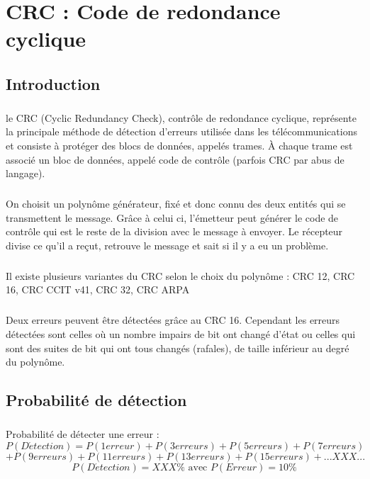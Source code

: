 
\chapter{CRC : Code de redondance cyclique}

    \section{Introduction}

        \paragraph{}
le CRC (Cyclic Redundancy Check), contrôle de redondance cyclique,
représente la principale méthode de détection d'erreurs utilisée dans les télécommunications et
consiste à protéger des blocs de données, appelés trames.
À chaque trame est associé un bloc de données, appelé code de contrôle (parfois CRC par abus de langage).
        \paragraph{}
On choisit un polynôme générateur, fixé et donc connu des deux entités qui se transmettent le message.
Grâce à celui ci, l'émetteur peut générer le code de contrôle qui est le reste de la division avec le message à envoyer.
Le récepteur divise ce qu'il a reçut, retrouve le message et sait si il y a eu un problème.
        \paragraph{}
Il existe plusieurs variantes du CRC selon le choix du polynôme : CRC 12, CRC 16, CRC CCIT v41, CRC 32, CRC ARPA
        \paragraph{}
Deux erreurs peuvent être détectées grâce au CRC 16.
Cependant les erreurs détectées sont celles où un nombre impairs de bit ont changé d'état ou
celles qui sont des suites de bit qui ont tous changés (rafales), de taille inférieur au
degré du polynôme.


    \section{Probabilité de détection}

        \paragraph{}
Probabilité de détecter une erreur :
\[  P(D\acute{e}tection) = P(1 erreur) + P(3 erreurs) + P(5 erreurs) + P(7 erreurs) \]
\[  + P(9 erreurs) + P(11 erreurs) + P(13 erreurs) + P(15 erreurs) + ...XXX... \]
\[  P(D\acute{e}tection) =  XXX\% \text{ avec } P( Erreur ) = 10\% \]


